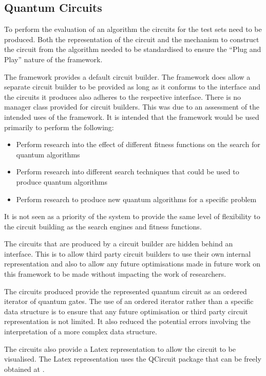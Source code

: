 \subsection{Quantum Circuits}
To perform the evaluation of an algorithm the circuits for the test sets need to be produced.
Both the representation of the circuit and the mechanism to construct the circuit from the algorithm needed to be standardised to ensure the ``Plug and Play'' nature of the framework.

The framework provides a default circuit builder.
The framework does allow a separate circuit builder to be provided as long as it conforms to the interface and the circuits it produces also adheres to the respective interface.
There is no manager class provided for circuit builders.
This was due to an assessment of the intended uses of the framework.
It is intended that the framework would be used primarily to perform the following:
\begin{itemize}
  \item Perform research into the effect of different fitness functions on the search for quantum algorithms
  \item Perform research into different search techniques that could be used to produce quantum algorithms
  \item Perform research to produce new quantum algorithms for a specific problem
\end{itemize}

It is not seen as a priority of the system to provide the same level of flexibility to the circuit building as the search engines and fitness functions.

The circuits that are produced by a circuit builder are hidden behind an interface.
This is to allow third party circuit builders to use their own internal representation and also to allow any future optimisations made in future work on this framework to be made without impacting the work of researchers.

The circuits produced provide the represented quantum circuit as an ordered iterator of quantum gates.
The use of an ordered iterator rather than a specific data structure is to ensure that any future optimisation or third party circuit representation is not limited.
It also reduced the potential errors involving the interpretation of a more complex data structure.

The circuits also provide a Latex representation to allow the circuit to be visualised.
The Latex representation uses the QCircuit package that can be freely obtained at \cite{QCsite}.

